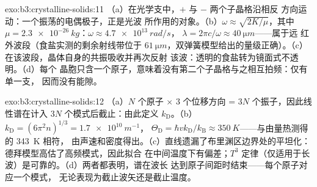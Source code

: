 \begin{solution}{exo:b3:crystalline-solids:11}
（a）在光学支中，$+$ 与 $-$ 两个子晶格沿相反
方向运动：一个振荡的电偶极子，正是光波
所作用的对象。（b）$\omega \approx \sqrt{2K/\mu}$，其中 $\mu =
\qty{2.3e-26}{kg}$：$\omega \approx \qty{4.7e13}{rad/s}$，
$\lambda = 2\pi c/\omega \approx \qty{40}{\micro m}$——属于远
红外波段（食盐实测的剩余射线带位于
$\qty{61}{\micro m}$，双弹簧模型给出的量级正确）。（c）
在该波段，晶体自身的共振吸收并再次反射
该波：透明的食盐转为镜面式不透明。（d）每个
晶胞只含一个原子，意味着没有第二个子晶格与之相互拍频：仅有单一支，
因而没有能隙。
\end{solution}

\begin{solution}{exo:b3:crystalline-solids:12}
（a）$N$ 个原子 $\times$ 3 个位移方向 = $3N$
个振子，因此线性谱在计入
$3N$ 个模式后截止：由此定义 $k_{\text{D}}$。（b）
$k_{\text{D}} = (6\pi^2n)^{1/3} = \qty{1.7e10}{m^{-1}}$，
$\Theta_{\text{D}} = \hbar vk_{\text{D}}/k_{\text{B}} \approx
\qty{350}{K}$——与由量热测得的 \qty{343}{K} 相符，
由声速和密度得出。（c）直线遗漏了布里渊区边界处的平坦化：
德拜模型高估了高频模式，因此拟合
在中间温度下有偏差；$T^3$ 定律（仅适用于长
波）是可靠的。（d）两者都表明，谱在波长
达到原子间距时结束——每个原子对应一个模式，
无论表现为截止波矢还是截止温度。
\end{solution}

